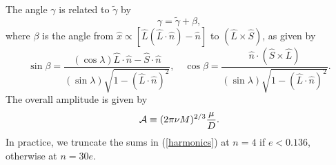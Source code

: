 \documentclass{iopart}
\def\be{\begin{equation}}
\def\ee{\end{equation}}
\begin{document}
The angle $\gamma$ is related to $\tilde \gamma$ by
\be
\label{beta}
\gamma = \tilde\gamma + \beta,
\ee
where $\beta$ is the angle from $\hat x \propto [\hat L(\hat L \cdot \hat n) - \hat n] $ to $(\hat L \times \hat S)$, as given by
\begin{equation}\label{sinbeta}
\sin\beta = \frac{(\cos\lambda) \hat L\cdot\hat n -\hat S\cdot \hat n }
{(\sin\lambda)\sqrt{1 - (\hat L\cdot\hat n)^2}}, \quad
\cos\beta = \frac{\hat n \cdot (\hat S \times \hat L)}
{(\sin\lambda)\sqrt{1 - (\hat L\cdot\hat n)^2} }.
\end{equation}
%
The overall amplitude is given by
\begin{equation} \label{calA}
{\cal A}\equiv (2\pi \nu M)^{2/3}\frac{\mu}{D}.
\end{equation}
In practice, we truncate the sums in (\ref{harmonics}) at $n=4$ if $e < 0.136$, otherwise at $n = 30 e$.
\end{document}
